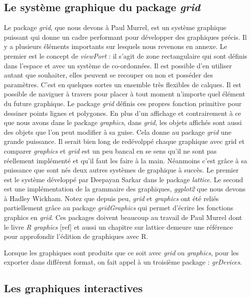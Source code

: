 \documentclass[]{article}
\begin{document}
\hypertarget{le-systuxe8me-graphique-du-package-grid}{%
\subsection{\texorpdfstring{Le système graphique du package \emph{grid}}{Le système graphique du package grid}}\label{le-systuxe8me-graphique-du-package-grid}}

Le package \emph{grid}, que nous devons à Paul Murrel, est un système graphique puissant qui donne un cadre performant pour développer des graphiques précis. Il y a plusieurs éléments importants sur lesquels nous revenons en annexe. Le premier est le concept de \emph{viewPort} : il s'agit de zone rectangulaire qui sont définis dans l'espace et avec un système de co-ordonnées. Il est possible d'en utiliser autant que souhaiter, elles peuvent se recouper ou non et posséder des paramètres. C'est en quelques sortes un ensemble très flexibles de calques. Il est possible de naviguer à travers pour placer à tout moment n'importe quel élément du future graphique. Le package \emph{grid} définis ces propres fonction primitive pour dessiner points lignes et polygones. En plus d'un affichage et contrairement à ce que nous avons dans le package \emph{graphics}, dans \emph{grid}, les objets affichés sont aussi des objets que l'on peut modifier à sa guise. Cela donne au package \emph{grid} une grande puissance. Il serait bien long de redévolppé chaque graphique avec grid et comparer \emph{graphics} et \emph{grid} est un peu bancal en se sens qu'il ne sont pas réellement implémenté et qu'il faut les faire à la main. Néanmoins c'est grâce à sa puissance que sont nés deux autres systèmes de graphique à succès. Le premier est le système développé par Deepayan Sarkar dans le package \emph{lattice}. Le second est une implémentation de la grammaire des graphiques, \emph{ggplot2} que nous devons à Hadley Wickham. Notez que depuis peu, \emph{grid} et \emph{graphics} ont été reliés partiellement grâce au package \emph{gridGraphics} qui permet d'écrire les fonctions graphics en \emph{grid}.
Ces packages doivent beaucoup au travail de Paul Murrel dont le livre \emph{R graphics} {[}ref{]} et aussi un chapitre sur lattice demeure une référence pour approfondir l'édition de graphiques avec R.

Lorsque les graphiques sont produits que ce soit avec \emph{grid} ou \emph{graphics}, pour les exporter dans différent format, on fait appel à un troisième package : \emph{grDevices}.

\hypertarget{les-graphiques-interactives}{%
\subsection{Les graphiques interactives}\label{les-graphiques-interactives}}
\end{document}
